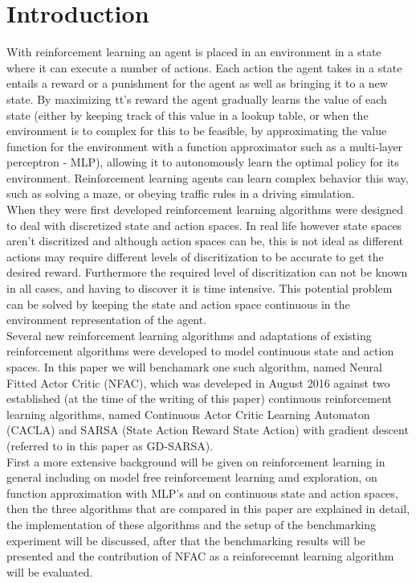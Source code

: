
\section{Introduction}

With reinforcement learning an agent is placed in an environment in a state where it can execute a number of actions. Each
action the agent takes in a state entails a reward or a punishment for the agent as well as bringing it to a new state.
By maximizing tt's reward the agent gradually learns the value of each state (either by keeping track of this value in a
lookup table, or when the environment is to complex for this to be feasible, by approximating the value function for the
environment with a function approximator such as a multi-layer perceptron - MLP), allowing it to autonomously learn the optimal policy
for its environment. Reinforcement learning agents can learn complex behavior this way, such as solving a maze, or obeying
traffic rules in a driving simulation. \\ %
When they were first developed reinforcement learning algorithms were designed to deal with discretized state and action
spaces. In real life however state spaces aren't discritized and although action spaces can be, this is not ideal as different
actions may require different levels of discritization to be accurate to get the desired reward. Furthermore the required level
of discritization can not be known in all cases, and having to discover it is time intensive. %
This potential problem can be solved by keeping the state and action space continuous in the environment representation of the agent. \\
Several new reinforcement learning algorithms and adaptations of existing reinforcement algorithms were developed to model continuous
state and action spaces. In this paper we will benchamark one such algorithm, named Neural Fitted Actor Critic (NFAC), which was develeped in August 2016 %
against two established (at the time of the writing of this paper) continuous reinforcement learning algorithms, named Continuous Actor Critic Learning Automaton (CACLA) %
and SARSA (State Action Reward State Action) with gradient descent (referred to in this paper as GD-SARSA). \\
First a more extensive background will be given on reinforcement learning in general including on model free reinforcement learning amd exploration,
on function approximation with MLP's and on continuous state and action spaces, then the three algorithms that are compared
 in this paper are explained in detail, the implementation of these algorithms and the setup of the benchmarking experiment will be discussed,
 after that the benchmarking results will be presented and the contribution of NFAC as a reinforecemnt learning algorithm will be evaluated.
